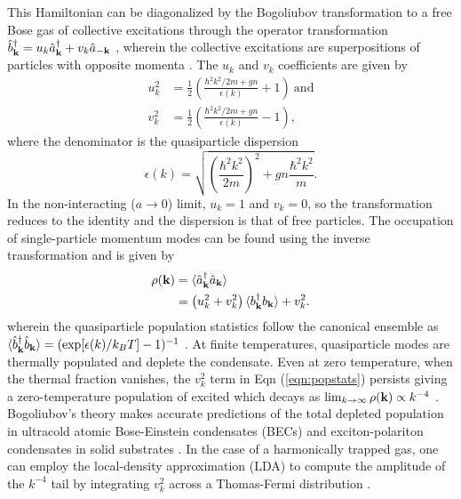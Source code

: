     This Hamiltonian can be diagonalized by the Bogoliubov transformation to a free Bose gas of collective excitations through the operator transformation $\hat{b}_{\textbf{k}}^\dagger = u_k \hat{a}_{\textbf{k}}^\dagger + v_k \hat{a}_{-\textbf{k}}$ \cite{Bogolubov47,PethickSmith}, wherein the collective excitations are superpositions of particles with opposite momenta \cite{Vogels02}. 
    The $u_k$ and $v_k$ coefficients are given by
	\begin{align}
		u_{k}^2 &= \frac{1}{2}\left(\frac{\hbar^2k^2/2m + gn}{\epsilon(k)} + 1\right)~\textrm{and}\\
		v_{k}^2 &= \frac{1}{2}\left(\frac{\hbar^2k^2/2m + gn}{\epsilon(k)} - 1\right),
	\end{align}
	where the denominator is the quasiparticle dispersion
	\begin{equation}
		\epsilon(k) = \sqrt{\left(\frac{\hbar^2k^2}{2m}\right)^2 + gn\frac{ \hbar^2k^2}{m}}.
	\end{equation}
	In the non-interacting ($a\rightarrow0$) limit, $u_k=1$ and $v_k=0$, so the transformation reduces to the identity and the dispersion is that of free particles. 
	The occupation of single-particle momentum modes can be found using the inverse transformation and is given by
	 \begin{align}
	 \rho(\textbf{k}) &= \langle\hat{a}_{\textbf{k}}^\dagger\hat{a}_{\textbf{k}}\rangle\\
		 &=\left(u_{k}^{2}+v_{k}^{2}\right)\langle b_{\textbf{k}}^{\dagger}b_{\textbf{k}}\rangle + v_{k}^{2}.
		 \label{eqn:popstats}
	 \end{align}
	wherein the quasiparticle population statistics follow the canonical ensemble as $\langle \hat{b}^\dagger_{\textbf{k}}\hat{b}_{\textbf{k}}\rangle = (\exp[\epsilon(k)/k_B T]-1)^{-1}$ \cite{PitaevskiiStringari,Chang16}. At finite temperatures, quasiparticle modes are thermally populated and deplete the condensate.  Even at zero temperature, when the thermal fraction vanishes, the $v_k^2$ term in Eqn (\ref{eqn:popstats}) persists giving a zero-temperature population of excited %
	 which decays as $\lim_{k\rightarrow\infty}\rho(\textbf{k})\propto k^{-4}$ \cite{PethickSmith,PitaevskiiStringari,Chang16}. 
	Bogoliubov's theory makes accurate predictions of the total depleted population in ultracold atomic Bose-Einstein condensates (BECs) \cite{Xu06,Lopes17_depletion} and exciton-polariton condensates in solid substrates \cite{pieczarka20}.
	In the case of a harmonically trapped gas, one can employ the local-density approximation (LDA) to compute the amplitude of the $k^{-4}$ tail by  integrating $v_k^2$ across a Thomas-Fermi distribution \cite{Chang16}. 

